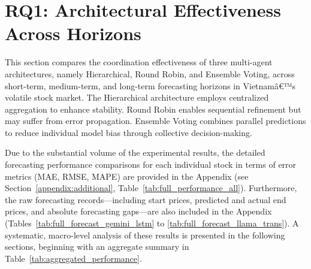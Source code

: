 \documentclass{ieeeaccess}
\begin{document}
\section{RQ1: Architectural Effectiveness Across Horizons}
This section compares the coordination effectiveness of three multi-agent architectures, namely Hierarchical, Round Robin, and Ensemble Voting, across short-term, medium-term, and long-term forecasting horizons in Vietnamâ€™s volatile stock market. The Hierarchical architecture employs centralized aggregation to enhance stability. Round Robin enables sequential refinement but may suffer from error propagation. Ensemble Voting combines parallel predictions to reduce individual model bias through collective decision-making.

Due to the substantial volume of the experimental results, the detailed forecasting performance comparisons for each individual stock in terms of error metrics (MAE, RMSE, MAPE) are provided in the Appendix (see Section~\ref{appendix:additional}, Table~\ref{tab:full_performance_all}). Furthermore, the raw forecasting records---including start prices, predicted and actual end prices, and absolute forecasting gaps---are also included in the Appendix (Tables~\ref{tab:full_forecast_gemini_lstm} to \ref{tab:full_forecast_llama_trans}). A systematic, macro-level analysis of these results is presented in the following sections, beginning with an aggregate summary in Table~\ref{tab:aggregated_performance}.
\end{document}
